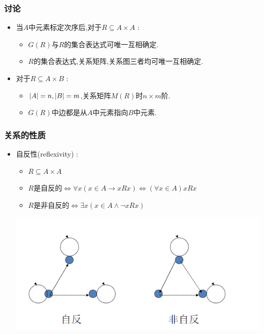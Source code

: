 {{{  \subsubsection{讨论}{
    \begin{itemize}
      \item 当$A$中元素标定次序后,对于$R \subseteq A \times A$ : \begin{itemize}
              \item $G(R)$与$R$的集合表达式可唯一互相确定.
              \item $R$的集合表达式,关系矩阵,关系图三者均可唯一互相确定.
            \end{itemize}
      \item 对于$R \subseteq A \times B$ : \begin{itemize}
              \item $\left\lvert A \right\vert = n,\left\lvert B \right\vert = m$,关系矩阵$M(R)$时$n \times m$阶.
              \item $G(R)$中边都是从$A$中元素指向$B$中元素.
            \end{itemize}
    \end{itemize}
  }%

  \subsubsection{关系的性质}{
    \begin{itemize}
      \item {
            自反性(reflexivity) : \begin{itemize}
              \item $R \subseteq A \times A$
              \item $R$是自反的$\Leftrightarrow \forall x(x \in A \to xRx) \Leftrightarrow (\forall x \in A)xRx$
              \item $R$是非自反的$\Leftrightarrow \exists x (x \in A \land \lnot xRx)$
            \end{itemize}

            \begin{center}
              \includegraphics{resources/reflexivity.png}
            \end{center}

}
\end{itemize}}}}}
